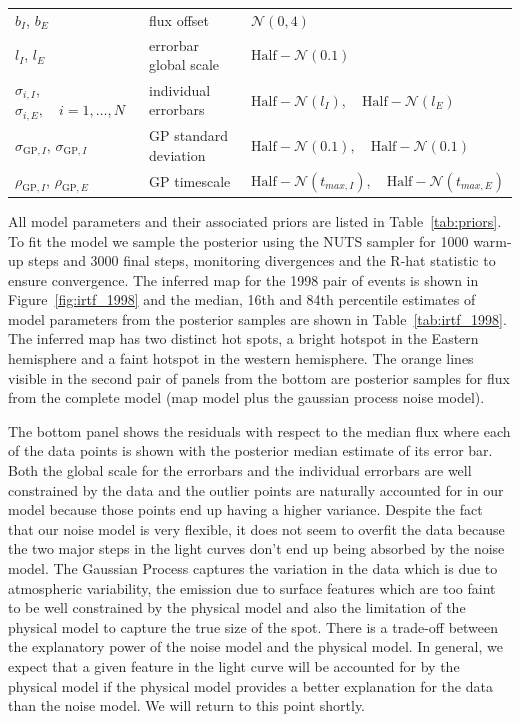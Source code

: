 \documentclass[12pt,dvipsnames]{report}
\begin{document}
\begin{table}[t!]
\begin{center}
\begin{longtable}{W{l}{4cm} W{l}{4cm} W{l}{6cm}}
    $b_I$, $b_E$& flux offset &$\mathcal{N}(0, 4)$
            \\
            $l_I$, $l_E$& errorbar global scale&$\mathrm{Half}-\mathcal{N}(0.1)$
            \\
            $\sigma_{i,I}$, $\sigma_{i,E},\quad i=1,\dots,N$& individual errorbars&
            $\mathrm{Half}-\mathcal{N}(l_I),\quad \mathrm{Half}- \mathcal{N}(l_E)$
            \\
            $\sigma_{\mathrm{GP}, I}$, $\sigma_{\mathrm{GP}, I}$ & GP standard deviation&$ \mathrm{Half}-\mathcal{N}(0.1),\quad \mathrm{Half}-\mathcal{N}(0.1)$
            \\
            $\rho_{\mathrm{GP},I}$, $\rho_{\mathrm{GP},E}$ & GP timescale  & $ \mathrm{Half}-\mathcal{N}( t_{max, I}),\quad  \mathrm{Half}-\mathcal{N}(t_{max, E})$
        \\
        \end{longtable}
    \end{center}
\end{table}

All model parameters and their associated priors are listed in Table~\ref{tab:priors}. 
To fit the model we sample the posterior using the NUTS sampler for 1000 warm-up steps and 3000 final steps, monitoring divergences and the R-hat statistic to ensure convergence.
The inferred map for the 1998 pair of events is shown in Figure~\ref{fig:irtf_1998} and the median, 16th and 84th percentile estimates of model parameters from the posterior samples are shown in Table~\ref{tab:irtf_1998}. 
The inferred map has two distinct hot spots, a bright hotspot in the Eastern hemisphere and a faint hotspot in the western hemisphere.
The orange lines visible in the second pair of panels from the bottom are posterior samples for flux from the complete model (map model plus the gaussian process noise model).

The bottom panel shows the residuals with respect to the median flux where each of the data points is shown with the posterior median estimate of its error bar.
Both the global scale for the errorbars and the individual errorbars are well constrained by the data and the outlier points are naturally accounted for in our model because those points end up having a higher variance.
Despite the fact that our noise model is very flexible, it does not seem to overfit the data because the two major steps in the light curves don't end up being absorbed by the noise model.
The Gaussian Process captures the  variation in the data which is due to atmospheric variability, the emission due to surface features which are too faint to be well constrained by the physical model and also the limitation of the physical model to capture the true size of the spot. 
There is a trade-off between the explanatory power of the noise model and the physical model. 
In general, we expect that a given feature in the light curve will be accounted for by the physical model if the physical model provides a better explanation for the data than the noise model.
We will return to this point shortly. 
\end{document}
